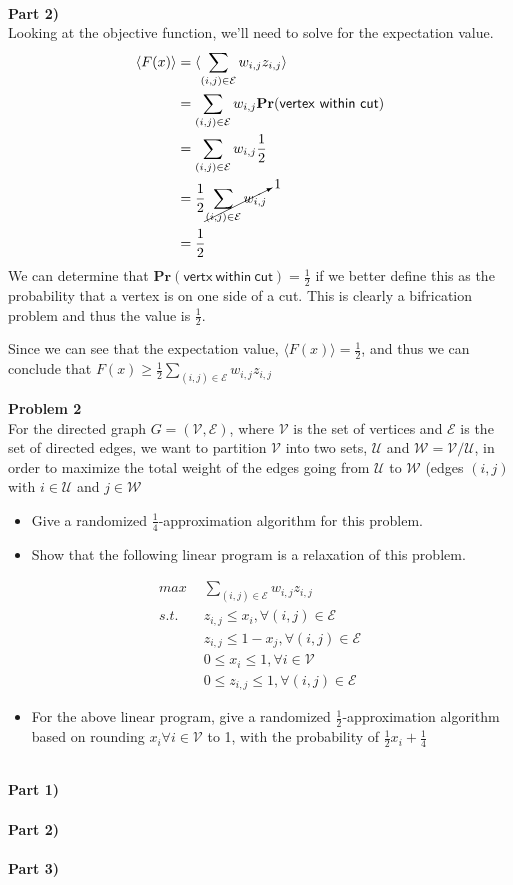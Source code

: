 \documentclass[12pt,letter]{article}
\newcommand{\problem}[1]{\vspace{3mm}\Large\textbf{{Problem {#1}\vspace{3mm}}}\normalsize\\}
\newcommand{\ppart}[1]{\vspace{2mm}\large\textbf{\\Part {#1})\vspace{2mm}}\normalsize\\}
\begin{document}
\ppart{2}
Looking at the objective function, we'll need to solve for the expectation value.
\begin{align*}
    \langle F(x)\rangle &= \langle\sum\limits_{(i,j)\in\mathcal{E}} w_{i,j}z_{i,j}\rangle\\
           &= \sum\limits_{(i,j)\in\mathcal{E}} w_{i,j}\mathbf{Pr}(\mathsf{vertex\ within\ cut}) \\
           &= \sum\limits_{(i,j)\in\mathcal{E}} w_{i,j}\frac12\\
           &= \frac12 \cancelto{1}{\sum\limits_{(i,j)\in\mathcal{E}}w_{i,j}} \\
           &= \frac12
\end{align*}
We can determine that $\mathbf{Pr}(\mathsf{vertx\ within\ cut}) = \frac12$ if
we better define this as the probability that a vertex is on one side of a cut.
This is clearly a bifrication problem and thus the value is $\frac12$.

Since we can see that the expectation value, $\langle F(x)\rangle = \frac12$, 
and thus we can conclude that $F(x)\geq \frac12\sum\limits_{(i,j)\in\mathcal{E}}w_{i,j}z_{i,j}$

\problem{2}
For the directed graph $G=(\mathcal{V,E})$, where $\mathcal{V}$ is the set of 
vertices and $\mathcal{E}$ is the set of directed edges, we want to partition 
$\mathcal{V}$ into two sets, $\mathcal{U}$ and $\mathcal{W}=\mathcal{V}/
\mathcal{U}$, in order to maximize the total weight of the edges going from 
$\mathcal{U}$ to $\mathcal{W}$ (edges $(i,j)$ with $i\in\mathcal{U}$ and 
$j\in\mathcal{W}$

\begin{itemize}
    \item Give a randomized $\frac14$-approximation algorithm for this problem.
    \item Show that the following linear program is a relaxation of this problem.
\end{itemize}
\begin{align*}
    max & \sum\limits_{(i,j)\in\mathcal{E}} w_{i,j}z_{i,j}\\
    s.t.\hspace{1em}& z_{i,j} \leq x_i, \forall(i,j)\in \mathcal{E}\\
        & z_{i,j}\leq 1 - x_j, \forall(i,j)\in \mathcal{E}\\
        & 0 \leq x_i \leq 1, \forall i\in \mathcal{V}\\
        & 0 \leq z_{i,j} \leq 1, \forall (i,j)\in\mathcal{E}
\end{align*}
\begin{itemize}
    \item For the above linear program, give a randomized $\frac12$-approximation
          algorithm based on rounding $x_i\forall i\in\mathcal{V}$ to 1, with the
          probability of $\frac12x_i + \frac14$
\end{itemize}

\ppart{1}

\ppart{2}

\ppart{3}
\end{document}
